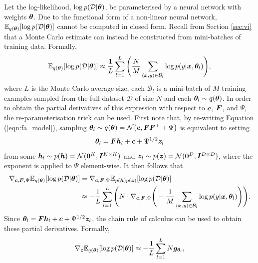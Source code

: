 \documentclass[10pt]{article} %
\begin{document}
Let the log-likelihood, $\log p(\mathcal{D} | {\bm{\theta}})$, be parameterised by a neural network with weights ${\bm{\theta}}$. Due to the functional form of a non-linear neural network, $\mathbb{E}_{q({\bm{\theta}})} [\log p(\mathcal{D} | {\bm{\theta}})]$ cannot be computed in closed form. Recall from Section \ref{sec:vi} that a Monte Carlo estimate can instead be constructed from mini-batches of training data. Formally, 
\begin{equation}
	 \mathbb{E}_{q({\bm{\theta}})} [\log p(\mathcal{D} | {\bm{\theta}})]
	\approx \frac{1}{L} \sum_{l=1}^{L} \Bigg( \frac{N}{M} \sum_{({\bm{x}}, y) \in \mathcal{B}_l} \log p(y | {\bm{x}}, {\bm{\theta}}_l) \Bigg),
\end{equation}
where $L$ is the Monte Carlo average size, each $\mathcal{B}_l$ is a mini-batch of $M$ training examples sampled from the full dataset $\mathcal{D}$ of size $N$ and each ${\bm{\theta}}_l \sim q({\bm{\theta}})$. In order to obtain the partial derivatives of this expression with respect to ${\bm{c}}$, ${\bm{F}}$, and $\Psi$, the re-parameterisation trick \citep{goodfellow2016} can be used. First note that, by re-writing Equation (\ref{eqn:fa_model}), sampling ${\bm{\theta}}_l \sim q({\bm{\theta}}) = \mathcal{N}\big({\bm{c}}, {\bm{F}} {\bm{F}}^{\top} + \Psi\big)$ is equivalent to setting  
\begin{equation}\label{eqn:fa_reparam_trick}
	{\bm{\theta}}_l = {\bm{F}} {\bm{h}}_l + {\bm{c}} + \Psi^{1/2} {\bm{z}}_l
\end{equation}
from some ${\bm{h}}_l \sim p({\bm{h}}) = \mathcal{N}(\bm{0}^K, {\bm{I}}^{K \times K})$ and ${\bm{z}}_l \sim p({\bm{z}}) = \mathcal{N}(\bm{0}^D, {\bm{I}}^{D \times D})$, where the exponent is applied to $\Psi$ element-wise. 
It then follows that
\begin{align}
\begin{split}
\label{eqn:expected_grad_log_likelihood}
	\nabla_{{\bm{c}}, {\bm{F}}, \Psi} \mathbb{E}_{q({\bm{\theta}})} [\log p(\mathcal{D} | {\bm{\theta}})]
	& = \nabla_{{\bm{c}}, {\bm{F}}, \Psi} \mathbb{E}_{p({\bm{h}})p({\bm{z}})} [\log p(\mathcal{D} | {\bm{\theta}})] \\
	& \approx -\frac{1}{L} \sum_{l=1}^{L} \Bigg(N \cdot \nabla_{{\bm{c}}, {\bm{F}}, \Psi} \Bigg( -\frac{1}{M} \sum_{({\bm{x}}, y) \in \mathcal{B}_l} \log p(y | {\bm{x}}, {\bm{\theta}}_l) \Bigg) \Bigg).
\end{split}
\end{align}
Since ${\bm{\theta}}_l = {\bm{F}} {\bm{h}}_l + {\bm{c}} + \Psi^{1/2} {\bm{z}}_l$, the chain rule of calculus can be used to obtain these partial derivatives. Formally,
\begin{equation}
	 \nabla_{\bm{c}} \mathbb{E}_{q({\bm{\theta}})} [\log p(\mathcal{D} | {\bm{\theta}})]
	 \approx -\frac{1}{L} \sum_{l=1}^{L} N {\bm{g}}_{{\bm{\theta}}_l},
\end{equation}
\end{document}
